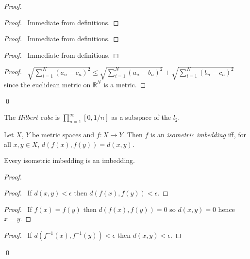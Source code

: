\begin{proof}
  \pf
  \begin{proof}
    \pf\ Immediate from definitions.
  \end{proof}
  \begin{proof}
    \pf\ Immediate from definitions.
  \end{proof}
  \begin{proof}
    \pf\ Immediate from definitions.
  \end{proof}
  \begin{proof}
    \pf\ $\sqrt{\sum_{i=1}^N (a_n - c_n)^2}  \leq \sqrt{\sum_{i=1}^N (a_n
      - b_n)^2} + \sqrt{\sum_{i=1}^N (b_n - c_n)^2}$ since the euclidean
    metric on $\mathbb{R}^N$ is a metric.
  \end{proof}
  \qed
\end{proof}

\begin{df}
  The \emph{Hilbert cube} is $\prod_{n=1}^\infty [0, 1/n]$ as a subspace of
  the $l_2$.
\end{df}

\begin{df}
  Let $X$, $Y$ be metric spaces and $f : X \rightarrow Y$. Then $f$ is an
  \emph{isometric imbedding} iff, for all $x, y \in X$, $d(f(x), f(y)) = d(x,
  y)$.
\end{df}

\begin{lm}
  Every isometric imbedding is an imbedding.
\end{lm}

\begin{proof}
  \pf
  \begin{proof}
    \pf\ If $d(x, y) < \epsilon$ then $d(f(x), f(y)) < \epsilon$.
  \end{proof}
  \begin{proof}
    \pf\ If $f(x) = f(y)$ then $d(f(x), f(y)) = 0$ so $d(x, y) = 0$ hence $x
    =y $.
  \end{proof}
  \begin{proof}
    \pf\ If $d(f^{-1}(x), f^{-1}(y)) < \epsilon$ then $d(x, y) < \epsilon$.
  \end{proof}
  \qed
\end{proof}
